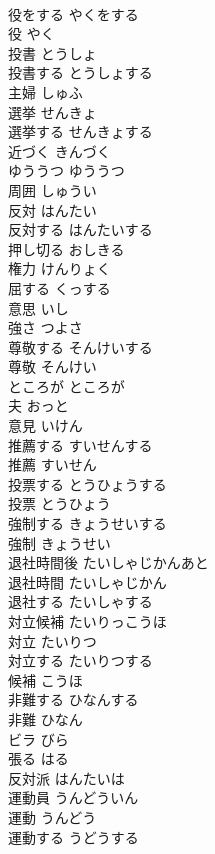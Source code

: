 \documentclass[8pt]{extreport}
\begin{document}
\begin{CJK}{UTF8}{min}
\\	役をする	やくをする	
\\	役	やく	
\\	投書	とうしょ	
\\	投書する	とうしょする	
\\	主婦	しゅふ	
\\	選挙	せんきょ	
\\	選挙する	せんきょする	
\\	近づく	きんづく	
\\	ゆううつ	ゆううつ	
\\	周囲	しゅうい	
\\	反対	はんたい	
\\	反対する	はんたいする	
\\	押し切る	おしきる	
\\	権力	けんりょく	
\\	屈する	くっする	
\\	意思	いし	
\\	強さ	つよさ	
\\	尊敬する	そんけいする	
\\	尊敬	そんけい	
\\	ところが	ところが	
\\	夫	おっと	
\\	意見	いけん	
\\	推薦する	すいせんする	
\\	推薦	すいせん	
\\	投票する	とうひょうする	
\\	投票	とうひょう	
\\	強制する	きょうせいする	
\\	強制	きょうせい	
\\	退社時間後	たいしゃじかんあと	
\\	退社時間	たいしゃじかん	
\\	退社する	たいしゃする	
\\	対立候補	たいりっこうほ	
\\	対立	たいりつ	
\\	対立する	たいりつする	
\\	候補	こうほ	
\\	非難する	ひなんする	
\\	非難	ひなん	
\\	ビラ	びら	
\\	張る	はる	
\\	反対派	はんたいは	
\\	運動員	うんどういん	
\\	運動	うんどう	
\\	運動する	うどうする	

\end{CJK}
\end{document}
